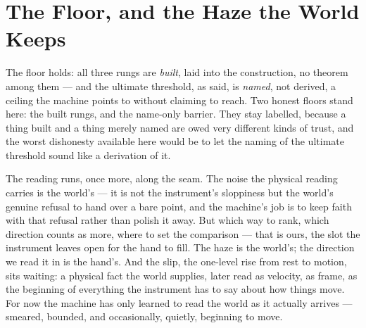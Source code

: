 \section{The Floor, and the Haze the World Keeps}

The floor holds: all three rungs are \emph{built}, laid into the construction, no theorem among them --- and the
ultimate threshold, as said, is \emph{named}, not derived, a ceiling the machine points to without claiming to
reach. Two honest floors stand here: the built rungs, and the name-only barrier. They stay labelled, because a
thing built and a thing merely named are owed very different kinds of trust, and the worst dishonesty available
here would be to let the naming of the ultimate threshold sound like a derivation of it.

The reading runs, once more, along the seam. The noise the physical reading carries is the world's --- it is not
the instrument's sloppiness but the world's genuine refusal to hand over a bare point, and the machine's job is
to keep faith with that refusal rather than polish it away. But which way to rank, which direction counts as
more, where to set the comparison --- that is ours, the slot the instrument leaves open for the hand to fill. The
haze is the world's; the direction we read it in is the hand's. And the slip, the one-level rise from rest to
motion, sits waiting: a physical fact the world supplies, later read as velocity, as frame, as
the beginning of everything the instrument has to say about how things move. For now the machine has only learned
to read the world as it actually arrives --- smeared, bounded, and occasionally, quietly, beginning to move.

